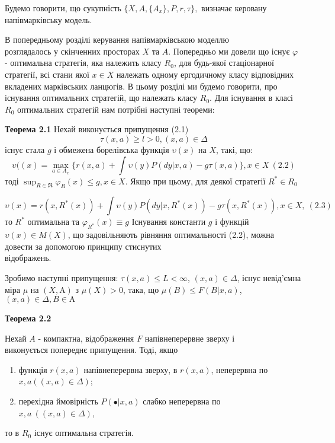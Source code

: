 \documentclass[a4paper, 14pt]{extarticle}
\newcommand{\Alpha}{\mathrm{A}}
\begin{document}
Будемо говорити, що сукупність $\{  X,A, \{ A_x \},P,r,\tau \},$ визначає керовану напівмарківську модель.\par
В попередньому розділі керування напівмарківською моделлю \\розглядалось у скінченних просторах $X$ та $A$. Попередньо ми довели що існує $\varphi$ - оптимальна стратегія, яка належить класу $R_0$, для будь-якої стаціонарної стратегії, всі стани якої $x \in X$ належать одному ергодичному класу відповідних вкладених марківських ланцюгів. В цьому розділі ми будемо говорити, про існування оптимальних стратегій, що належать класу $R_0$. Для існування в класі $R_0$ оптимальних стратегій нам потрібні наступні теореми:
\newline

 \textbf{Теорема 2.1}\newline
 Нехай виконується припущення (2.1) $$ \tau (x,a) \geq l > 0, (x,a) \in \Delta$$
 існує стала $g$  і обмежена борелівська функція $\upsilon(x)$ на $X$, такі, що:
 $$\upsilon((x) = \max_{a \in A_x} \{r(x,a) +\int \upsilon(y)P(dy|x,a) -g \tau(x,a)\}, x \in X  \ (2.2) $$ тоді
 $ \sup_{R \in \Re}\varphi_R(x) \leq g , x \in X$. \newline
 Якщо при цьому, для деякої стратегії $R^* \in R_0$
 
 $$ \upsilon(x) = r(x,R^*(x)) + \int \upsilon(y)P(dy|x,R^*(x)) - g \tau(x,R^*(x)), x \in X,\ (2.3) $$
 то $R^*$ оптимальна та $\varphi_{R^*}(x) \equiv g $
 \newline
 Існування константи $g$ і функцій $\upsilon(x) \in M(X)$, що задовільняють рівняння оптимальності (2.2), можна довести за допомогою принципу стиснутих \\відображень.\newline
\par Зробимо наступні припущення: \newline
 $\tau(x,a) \leq L < \infty$, $(x,a) \in \Delta$,\newline 
 існує невід'ємна міра $\mu$ на $(X,\Alpha)$ з $\mu(X) > 0$, така, що    
 $\mu(B)\leq F(B|x,a)$, $(x,a) \in \Delta, B \in \Alpha$\newline
 
 
  \textbf{Теорема 2.2}
 
 Нехай $A$  - компактна, відображення $F$ напівнеперервне зверху і\\ виконується попереднє припущення. Тоді, якщо
 \begin{enumerate}
 	\item функція $r(x,a)$ напівнеперервна зверху, в $r(x,a)$, неперервна по  \\ $x,a  ((x,a) \in \Delta)$;
 	\item перехідна ймовірність $P(\bullet|x,a)$ слабко неперервна по \\ $x,a \ ((x,a) \in \Delta)$,
 \end{enumerate}
 то в $R_0$ існує оптимальна стратегія.\newline
 
\end{document}
